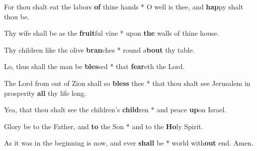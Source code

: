 \begin{multicols}{2}
	For thou shalt eat the labors \textbf{of} thine hands * O well is thee, and \textbf{hap}py shalt thou be.
	
	Thy wife shall be as the \textbf{fruit}ful vine * upon \textbf{the} walls of thine house.
	
	Thy children like the olive \textbf{bran}ches * round a\textbf{bout} thy table.
	
	Lo, thus shall the man be \textbf{bles}sed * that \textbf{fear}eth the Lord.
	
	The Lord from out of Zion shall so \textbf{bless} thee * that thou shalt see Jerusalem in prosperity \textbf{all} thy life long.
	
	Yea, that thou shalt see the children's \textbf{child}ren * and peace \textbf{up}on Israel.
	
	Glory be to the Father, and \textbf{to} the Son * and to the \textbf{Ho}ly Spirit.
	
	As it was in the beginning is now, and ever \textbf{shall} be * world with\textbf{out} end. Amen.
\end{multicols}